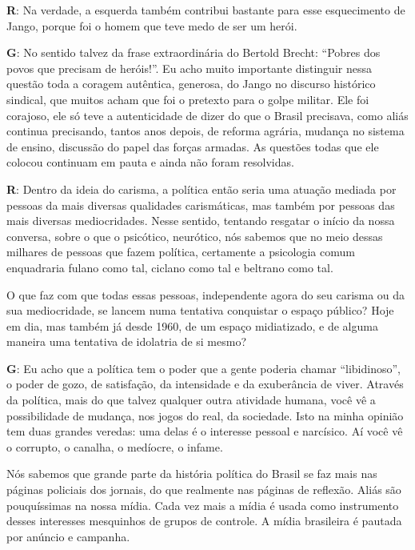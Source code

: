 \textbf{R}: Na verdade, a esquerda também contribui bastante para esse
esquecimento de Jango, porque foi o homem que teve medo de ser um herói.

 

\textbf{G}: No sentido talvez da frase extraordinária do Bertold Brecht:
``Pobres dos povos que precisam de heróis!''. Eu acho muito importante
distinguir nessa questão toda a coragem autêntica, generosa, do Jango no
discurso histórico sindical, que muitos acham que foi o pretexto para o
golpe militar. Ele foi corajoso, ele só teve a autenticidade de dizer do
que o Brasil precisava, como aliás continua precisando, tantos anos
depois, de reforma agrária, mudança no sistema de ensino, discussão do
papel das forças armadas. As questões todas que ele colocou continuam em
pauta e ainda não foram resolvidas.

 

\textbf{R}: Dentro da ideia do carisma, a política então seria uma
atuação mediada por pessoas da mais diversas qualidades carismáticas,
mas também por pessoas das mais diversas mediocridades. Nesse sentido,
tentando resgatar o início da nossa conversa, sobre o que o psicótico,
neurótico, nós sabemos que no meio dessas milhares de pessoas que fazem
política, certamente a psicologia comum enquadraria fulano como tal,
ciclano como tal e beltrano como tal.

 

O que faz com que todas essas pessoas, independente agora do seu carisma
ou da sua mediocridade, se lancem numa tentativa conquistar o espaço
público? Hoje em dia, mas também já desde 1960, de um espaço
midiatizado, e de alguma maneira uma tentativa de idolatria de si mesmo?

 

\textbf{G}: Eu acho que a política tem o poder que a gente poderia
chamar ``libidinoso'', o poder de gozo, de satisfação, da intensidade e
da exuberância de viver. Através da política, mais do que talvez
qualquer outra atividade humana, você vê a possibilidade de mudança, nos
jogos do real, da sociedade. Isto na minha opinião tem duas grandes
veredas: uma delas é o interesse pessoal e narcísico. Aí você vê o
corrupto, o canalha, o medíocre, o infame.

 

Nós sabemos que grande parte da história política do Brasil se faz mais
nas páginas policiais dos jornais, do que realmente nas páginas de
reflexão. Aliás são pouquíssimas na nossa mídia. Cada vez mais a mídia é
usada como instrumento desses interesses mesquinhos de grupos de
controle. A mídia brasileira é pautada por anúncio e campanha. 

